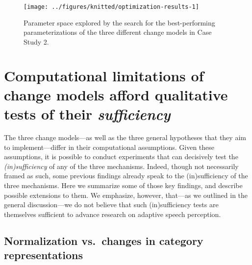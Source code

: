 \documentclass[
  11pt,
  man,floatsintext]{apa6}
\begin{document}
\begin{figure}

{\centering \texttt{[image: ../figures/knitted/optimization-results-1]} 

}

\caption{Parameter space explored by the search for the best-performing parameterizations of the three different change models in Case Study 2.}\label{fig:optimization-results}
\end{figure}

\hypertarget{sec:sufficiency}{%
\section{\texorpdfstring{Computational limitations of change models afford qualitative tests of their \emph{sufficiency}}{Computational limitations of change models afford qualitative tests of their sufficiency}}\label{sec:sufficiency}}

The three change models---as well as the three general hypotheses that they aim to implement---differ in their computational assumptions. Given these assumptions, it is possible to conduct experiments that can decisively test the \emph{(in)sufficiency} of any of the three mechanisms. Indeed, though not necessarily framed as such, some previous findings already speak to the (in)sufficiency of the three mechanisms. Here we summarize some of those key findings, and describe possible extensions to them. We emphasize, however, that---as we outlined in the general discussion---we do not believe that such (in)sufficiency tests are themselves sufficient to advance research on adaptive speech perception.

\hypertarget{normalization-vs.-changes-in-category-representations}{%
\subsection{Normalization vs.~changes in category representations}\label{normalization-vs.-changes-in-category-representations}}
\end{document}
